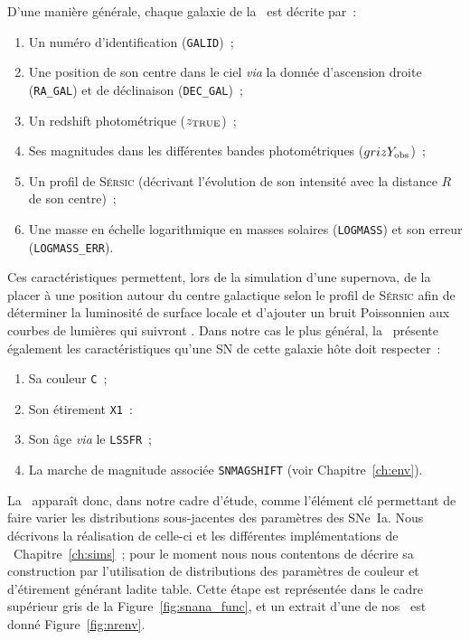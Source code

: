 \documentclass[../main/main.tex]{subfiles}
\begin{document}
D'une manière générale, chaque galaxie de la \hostlib\ est décrite par~:
\begin{enumerate}
    \item Un numéro d'identification (\texttt{GALID})~;
    \item Une position de son centre dans le ciel \textit{via} la donnée
        d'ascension droite (\texttt{RA\_GAL}) et de déclinaison
        (\texttt{DEC\_GAL})~;
    \item Un redshift photométrique ($z_{\rm TRUE}$)~;
    \item Ses magnitudes dans les différentes bandes photométriques ($grizY_{\rm
        obs}$)~;
    \item Un profil de \textsc{Sérsic} (décrivant l'évolution de son intensité
        avec la distance $R$ de son centre)~;
    \item Une masse en échelle logarithmique en masses solaires
        (\texttt{LOGMASS}) et son erreur (\texttt{LOGMASS\_ERR}).
\end{enumerate}
Ces caractéristiques permettent, lors de la simulation d'une supernova, de la
placer à une position autour du centre galactique selon le profil de
\textsc{Sérsic} afin de déterminer la luminosité de surface locale et d'ajouter
un bruit Poissonnien aux courbes de lumières qui suivront \citep{kessler2019}.
Dans notre cas le plus général, la \hostlib\ présente également les
caractéristiques qu'une SN de cette galaxie hôte doit respecter~:
\begin{enumerate}[resume]
    \item Sa couleur \texttt{C}~;
    \item Son étirement \texttt{X1}~:
    \item Son âge \textit{via} le \texttt{LSSFR}~;
    \item La marche de magnitude associée \texttt{SNMAGSHIFT} (voir
        Chapitre~\ref{ch:env}).
\end{enumerate}
La \hostlib\ apparaît donc, dans notre cadre d'étude, comme l'élément clé
permettant de faire varier les distributions sous-jacentes des paramètres des
SNe~Ia. Nous décrivons la réalisation de celle-ci et les différentes
implémentations de \hostlib\ Chapitre~\ref{ch:sims}~; pour le moment nous nous
contentons de décrire sa construction par l'utilisation de distributions des
paramètres de couleur et d'étirement générant ladite table. Cette étape est
représentée dans le cadre supérieur gris de la Figure~\ref{fig:snana_func}, et
un extrait d'une de nos \hostlib\ est donné Figure~\ref{fig:nrenv}.
\end{document}
